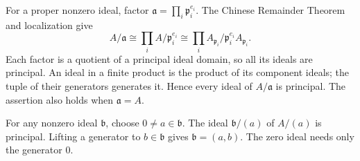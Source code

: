 For a proper nonzero ideal, factor $\mathfrak a=\prod_i\mathfrak p_i^{e_i}$. The Chinese Remainder Theorem and localization give
\[A/\mathfrak a\cong\prod_i A/\mathfrak p_i^{e_i}\cong\prod_i A_{\mathfrak p_i}/\mathfrak p_i^{e_i}A_{\mathfrak p_i}.\]
Each factor is a quotient of a principal ideal domain, so all its ideals are principal. An ideal in a finite product is the product of its component ideals; the tuple of their generators generates it. Hence every ideal of $A/\mathfrak a$ is principal. The assertion also holds when $\mathfrak a=A$.

For any nonzero ideal $\mathfrak b$, choose $0\ne a\in\mathfrak b$. The ideal $\mathfrak b/(a)$ of $A/(a)$ is principal. Lifting a generator to $b\in\mathfrak b$ gives $\mathfrak b=(a,b)$. The zero ideal needs only the generator $0$.
